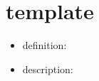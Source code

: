 \documentclass{article}
\begin{document}
\section*{template}
	
\begin{itemize}
	\item definition:
	\item description:
\end{itemize}


















































	
\end{document}
